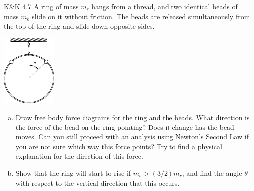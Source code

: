 \documentclass{esg8012pset}
\begin{document}
\begin{problem}{K\&K 4.7}
  A ring of mass $m_r$ hangs from a thread, and two identical beads of mass $m_b$ slide on it without friction. The beads are released simultaneously from the top of the ring and slide down opposite sides.
  \begin{center}\includegraphics[width=0.2\textwidth]{ps06_2}\end{center}
  \begin{enumerate}[(a)]
    \item Draw free body force diagrams for the ring and the beads. What direction is the force of the bead on the ring pointing? Does it change has the bead moves. Can you still proceed with an analysis using Newton's Second Law if you are not sure which way this force points? Try to find a physical explanation for the direction of this force.
    \item Show that the ring will start to rise if $m_b > (3/2)m_r$, and find the angle $\theta$ with respect to the vertical direction that this occurs.
  \end{enumerate}
\end{problem}
\end{document}
